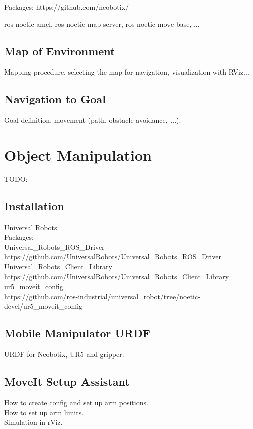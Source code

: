 Packages:
https://github.com/neobotix/

ros-noetic-amcl, ros-noetic-map-server, ros-noetic-move-base, ...

\subsection{Map of Environment}
Mapping procedure, selecting the map for navigation, visualization with RViz...\\

\subsection{Navigation to Goal}
Goal definition, movement (path, obstacle avoidance, ...).

\section{Object Manipulation}
TODO:\\

\subsection{Installation}
Universal Robots:\\

Packages:\\
Universal\_Robots\_ROS\_Driver
https://github.com/UniversalRobots/Universal\_Robots\_ROS\_Driver\\

Universal\_Robots\_Client\_Library\\
https://github.com/UniversalRobots/Universal\_Robots\_Client\_Library\\

ur5\_moveit\_config\\
https://github.com/ros-industrial/universal\_robot/tree/noetic-devel/ur5\_moveit\_config\\



\subsection{Mobile Manipulator URDF}
URDF for Neobotix, UR5 and gripper.\\

\subsection{MoveIt Setup Assistant}
How to create config and set up arm positions.\\
How to set up arm limits.\\
Simulation in rViz.\\

